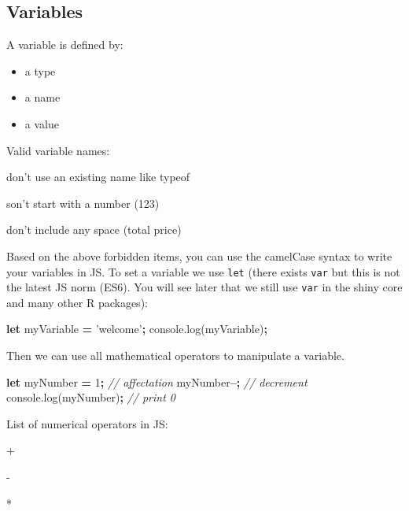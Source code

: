 \documentclass[]{book}
\newenvironment{Shaded}{\begin{snugshade}}{\end{snugshade}}
\newcommand{\AttributeTok}[1]{\textcolor[rgb]{0.77,0.63,0.00}{#1}}
\newcommand{\CommentTok}[1]{\textcolor[rgb]{0.56,0.35,0.01}{\textit{#1}}}
\newcommand{\DecValTok}[1]{\textcolor[rgb]{0.00,0.00,0.81}{#1}}
\newcommand{\KeywordTok}[1]{\textcolor[rgb]{0.13,0.29,0.53}{\textbf{#1}}}
\newcommand{\NormalTok}[1]{#1}
\newcommand{\OperatorTok}[1]{\textcolor[rgb]{0.81,0.36,0.00}{\textbf{#1}}}
\newcommand{\StringTok}[1]{\textcolor[rgb]{0.31,0.60,0.02}{#1}}
\newcommand{\VariableTok}[1]{\textcolor[rgb]{0.00,0.00,0.00}{#1}}
\providecommand{\tightlist}{%
  \setlength{\itemsep}{0pt}\setlength{\parskip}{0pt}}
\begin{document}
\hypertarget{variables}{%
\subsection{Variables}\label{variables}}

A variable is defined by:

\begin{itemize}
\tightlist
\item
  a type
\item
  a name
\item
  a value
\end{itemize}

Valid variable names:

don't use an existing name like typeof

son't start with a number (123)

don't include any space (total price)

Based on the above forbidden items, you can use the camelCase syntax to write your variables in JS. To set a variable we use \texttt{let} (there exists \texttt{var} but this is not the latest JS norm (ES6). You will see later that we still use \texttt{var} in the shiny core and many other R packages):

\begin{Shaded}
\begin{Highlighting}[]
\KeywordTok{let}\NormalTok{ myVariable }\OperatorTok{=} \StringTok{'welcome'}\OperatorTok{;}
\VariableTok{console}\NormalTok{.}\AttributeTok{log}\NormalTok{(myVariable)}\OperatorTok{;}
\end{Highlighting}
\end{Shaded}

Then we can use all mathematical operators to manipulate a variable.

\begin{Shaded}
\begin{Highlighting}[]
\KeywordTok{let}\NormalTok{ myNumber }\OperatorTok{=} \DecValTok{1}\OperatorTok{;} \CommentTok{// affectation}
\NormalTok{myNumber}\OperatorTok{--;} \CommentTok{// decrement}
\VariableTok{console}\NormalTok{.}\AttributeTok{log}\NormalTok{(myNumber)}\OperatorTok{;} \CommentTok{// print 0}
\end{Highlighting}
\end{Shaded}

List of numerical operators in JS:

+

-

*
\end{document}
